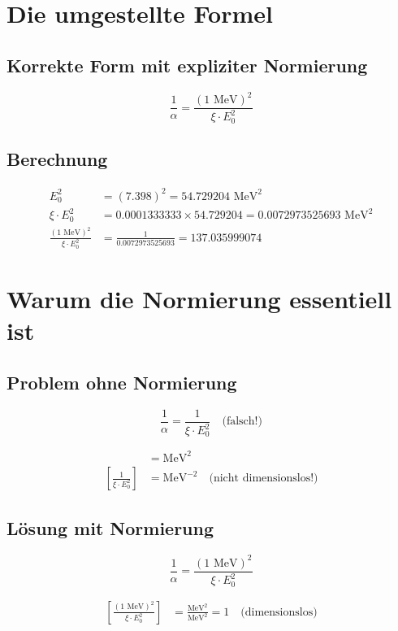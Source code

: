 \documentclass[12pt,a4paper]{article}
\theoremstyle{definition}
\begin{document}
	\section*{Die umgestellte Formel}
	
	\subsection*{Korrekte Form mit expliziter Normierung}
	
	\[
	\boxed{\frac{1}{\alpha} = \frac{(1 \text{ MeV})^2}{\xi \cdot E_0^2}}
	\]
	
	\subsection*{Berechnung}
	
	\begin{align*}
		E_0^2 &= (7.398)^2 = 54.729204 \text{ MeV}^2 \\
		\xi \cdot E_0^2 &= 0.0001333333 \times 54.729204 = 0.0072973525693 \text{ MeV}^2 \\
		\frac{(1 \text{ MeV})^2}{\xi \cdot E_0^2} &= \frac{1}{0.0072973525693} = 137.035999074
	\end{align*}
	
	\section*{Warum die Normierung essentiell ist}
	
	\subsection*{Problem ohne Normierung}
	
	\[
	\frac{1}{\alpha} = \frac{1}{\xi \cdot E_0^2} \quad \text{(falsch!)}
	\]
	
	\begin{align*}
		[\xi \cdot E_0^2] &= \text{MeV}^2 \\
		\left[\frac{1}{\xi \cdot E_0^2}\right] &= \text{MeV}^{-2} \quad \text{(nicht dimensionslos!)}
	\end{align*}
	
	\subsection*{Lösung mit Normierung}
	
	\[
	\frac{1}{\alpha} = \frac{(1 \text{ MeV})^2}{\xi \cdot E_0^2}
	\]
	
	\begin{align*}
		\left[\frac{(1 \text{ MeV})^2}{\xi \cdot E_0^2}\right] &= \frac{\text{MeV}^2}{\text{MeV}^2} = 1 \quad \text{(dimensionslos)}
	\end{align*}
	
\end{document}
